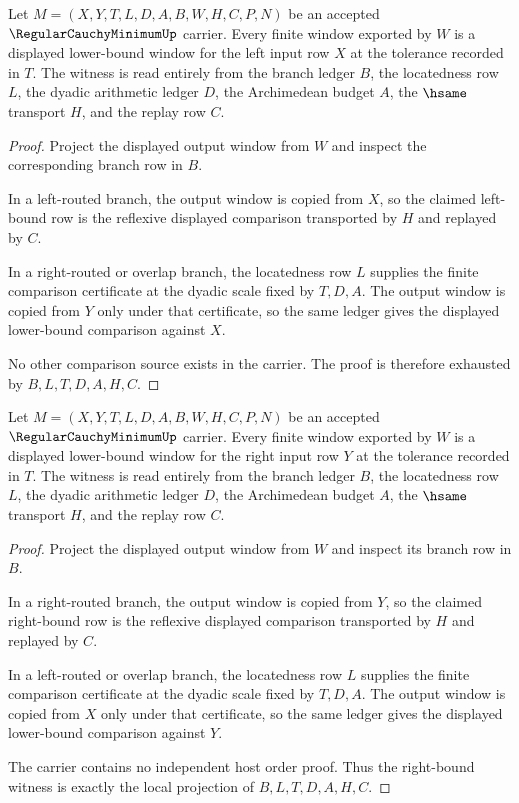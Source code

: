 \begin{theorem}\label{thm:regular-cauchy-minimum-left-bound}
Let $M=(X,Y,T,L,D,A,B,W,H,C,P,N)$ be an accepted $\RegularCauchyMinimumUp$ carrier. Every finite window exported by $W$ is a displayed lower-bound window for the left input row $X$ at the tolerance recorded in $T$. The witness is read entirely from the branch ledger $B$, the locatedness row $L$, the dyadic arithmetic ledger $D$, the Archimedean budget $A$, the $\hsame$ transport $H$, and the replay row $C$.
\end{theorem}
\begin{proof}
Project the displayed output window from $W$ and inspect the corresponding branch row in $B$.

In a left-routed branch, the output window is copied from $X$, so the claimed left-bound row is the reflexive displayed comparison transported by $H$ and replayed by $C$.

In a right-routed or overlap branch, the locatedness row $L$ supplies the finite comparison certificate at the dyadic scale fixed by $T,D,A$. The output window is copied from $Y$ only under that certificate, so the same ledger gives the displayed lower-bound comparison against $X$.

No other comparison source exists in the carrier. The proof is therefore exhausted by $B,L,T,D,A,H,C$.
\end{proof}

\begin{theorem}\label{thm:regular-cauchy-minimum-right-bound}
Let $M=(X,Y,T,L,D,A,B,W,H,C,P,N)$ be an accepted $\RegularCauchyMinimumUp$ carrier. Every finite window exported by $W$ is a displayed lower-bound window for the right input row $Y$ at the tolerance recorded in $T$. The witness is read entirely from the branch ledger $B$, the locatedness row $L$, the dyadic arithmetic ledger $D$, the Archimedean budget $A$, the $\hsame$ transport $H$, and the replay row $C$.
\end{theorem}
\begin{proof}
Project the displayed output window from $W$ and inspect its branch row in $B$.

In a right-routed branch, the output window is copied from $Y$, so the claimed right-bound row is the reflexive displayed comparison transported by $H$ and replayed by $C$.

In a left-routed or overlap branch, the locatedness row $L$ supplies the finite comparison certificate at the dyadic scale fixed by $T,D,A$. The output window is copied from $X$ only under that certificate, so the same ledger gives the displayed lower-bound comparison against $Y$.

The carrier contains no independent host order proof. Thus the right-bound witness is exactly the local projection of $B,L,T,D,A,H,C$.
\end{proof}

